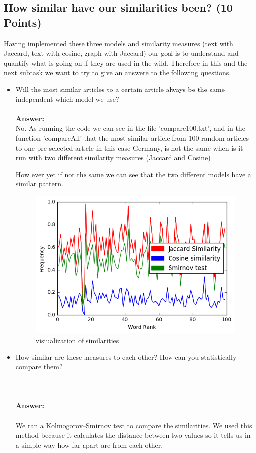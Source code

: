 \documentclass{WeSTassignment}
\begin{document}
\subsection{How similar have our similarities been? (10 Points)}
Having implemented these three models and similarity measures (text with Jaccard, text with cosine, graph with Jaccard) our goal is to understand and quantify what is going on if they are used in the wild. Therefore in this and the next subtask we want to try to give an answere to the following questions.

\begin{itemize}
\item Will the most similar articles to a certain article always be the same independent which model we use? \\\\
\textbf{Answer:}\\
No. As running the code we can see in the file 'compare100.txt', and in the function 'compareAll' that the most similar article from 100 random articles to one pre selected article in this case Germany, is not the same when is it run with two different similarity measures (Jaccard and Cosine) 

How ever yet if not the same we can see that the two different models have a similar pattern.

\begin{figure}[h!]
  \centering
  \includegraphics[scale=0.5]{compare.png}
   \caption{visiualization of similarities}
     \label{fig:dig} 
\end{figure}
\item How similar are these measures to each other? How can you statistically compare them?\\ \\ \\\\
\textbf{Answer:}\\\\
We ran a Kolmogorov–Smirnov test to compare the similarities.
We used this method because it calculates the distance between two values so it tells us in a simple way how far apart are from each other.
\end{itemize}
\end{document}

